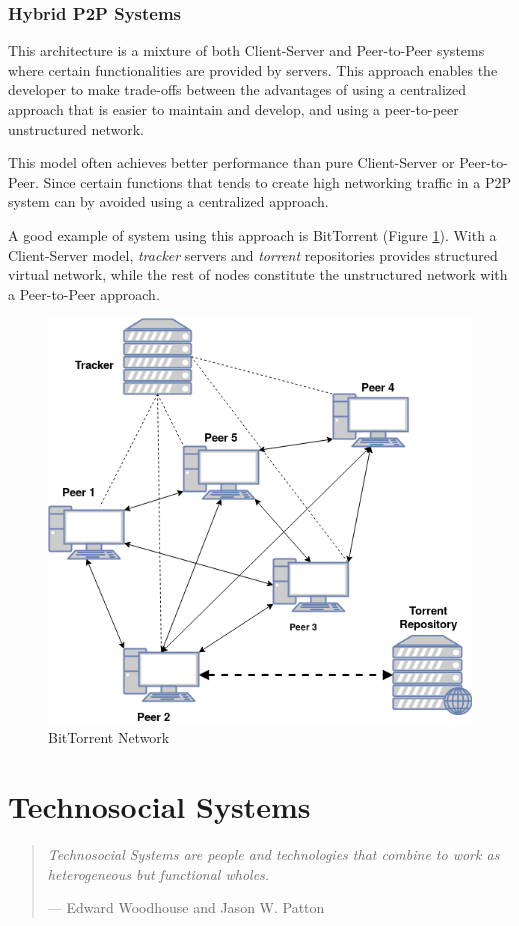 \subsubsection*{Hybrid P2P Systems}
This architecture is a mixture of both Client-Server and Peer-to-Peer systems where certain functionalities are provided by servers. This approach enables the developer to make trade-offs between the advantages of using a centralized approach that is easier to maintain and develop, and using a peer-to-peer unstructured network.

This model often achieves better performance than pure Client-Server or Peer-to-Peer. Since certain functions that tends to create high networking traffic in a P2P system can by avoided using a centralized approach.

A good example of system using this approach is BitTorrent\cite{bittorrent} (Figure \ref{fig:bittorrent}). With a Client-Server model, \textit{tracker} servers and \textit{torrent} repositories provides structured virtual network, while the rest of nodes constitute the unstructured network with a Peer-to-Peer approach.

\begin{figure}[h!]
    \centering
    \includegraphics[width=0.5\linewidth]{assets/images/bittorrent.png}
    \caption{BitTorrent Network}
    \label{fig:bittorrent}
\end{figure}  


\section{Technosocial Systems}
\begin{quote}
\textit{Technosocial Systems are people and technologies that combine to work as heterogeneous but functional wholes.}
    \begin{flushright}
        \tiny{--- Edward Woodhouse and Jason W. Patton \cite{technosocial}}
    \end{flushright}
\end{quote}


